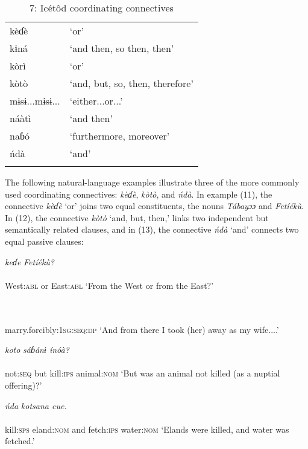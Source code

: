 \begin{table}
\caption{7: Icétôd coordinating connectives}
\label{tab:3}


\begin{tabularx}{\textwidth}{XX}
\lsptoprule

kèɗè & ‘or’\\
kɨná & ‘and then, so then, then’\\
kòrì & ‘or’\\
kòtò & ‘and, but, so, then, therefore’\\
mɨsɨ...mɨsɨ... & ‘either...or...’\\
náàtì & ‘and then’\\
naɓó & ‘furthermore, moreover’\\
ńdà & ‘and’\\
\lspbottomrule
\end{tabularx}
\end{table}
The following natural-language examples illustrate three of the more commonly used coordinating connectives: \textit{kèɗè}, \textit{kòtò}, and \textit{ńdà}. In example (11), the connective \textit{kèɗè} ‘or’ joins two equal constituents, the nouns \textit{Tábayɔɔ} and \textit{Fetíékù}. In (12), the connective \textit{kòtò} ‘and, but, then,’ links two independent but semantically related clauses, and in (13), the connective \textit{ńdà} ‘and’ connects two equal passive clauses:




\ea\label{ex:}
   \textit{keɗe}\textit{   Fetíékù?} \\
    \\
West:\textsc{abl}   or   East:\textsc{abl}
\glt ‘From the West or from the East?’ 
\z



\ea\label{ex:}
  \\
    \\
marry.forcibly:\textsc{1sg:seq:dp}
\glt ‘And from there I took (her) away as my wife....’ 
\z

\ea\label{ex:}
     \textit{koto}\textit{   sáɓánɨ   ínóà?} \\
    \\
not:\textsc{seq}   but   kill:\textsc{ips}   animal:\textsc{nom}
\glt ‘But was an animal not killed (as a nuptial offering)?’ 
\z



\ea\label{ex:}
   \textit{ńda}\textit{   kotsana   cue.} \\
    \\
kill:\textsc{sps}  eland:\textsc{nom}   and   fetch:\textsc{ips} water:\textsc{nom}
\glt ‘Elands were killed, and water was fetched.’ 
\z


